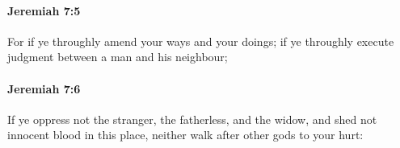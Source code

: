 		\paragraph{Jeremiah 7:5} %
			\label{JEREMIAH-7-5}

			For if ye throughly amend your ways and your doings; if ye throughly execute judgment between a man and his neighbour;


		\paragraph{Jeremiah 7:6} %
			\label{JEREMIAH-7-6}

			If ye oppress not the stranger, the fatherless, and the widow, and shed not innocent blood in this place, neither walk after other gods to your hurt:


